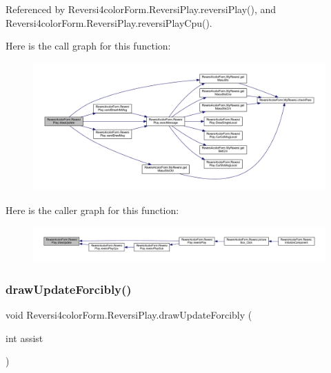 Referenced by Reversi4color\+Form.\+Reversi\+Play.\+reversi\+Play(), and Reversi4color\+Form.\+Reversi\+Play.\+reversi\+Play\+Cpu().

Here is the call graph for this function\+:
\nopagebreak
\begin{figure}[H]
\begin{center}
\leavevmode
\includegraphics[width=350pt]{class_reversi4color_form_1_1_reversi_play_a61428c9797c95359b397564d0bcfa7e7_cgraph}
\end{center}
\end{figure}
Here is the caller graph for this function\+:
\nopagebreak
\begin{figure}[H]
\begin{center}
\leavevmode
\includegraphics[width=350pt]{class_reversi4color_form_1_1_reversi_play_a61428c9797c95359b397564d0bcfa7e7_icgraph}
\end{center}
\end{figure}
\mbox{\label{class_reversi4color_form_1_1_reversi_play_a0ef55faf321fa98d44baad4f25ae6940}} 
\subsubsection{\texorpdfstring{draw\+Update\+Forcibly()}{drawUpdateForcibly()}}
{\footnotesize\ttfamily void Reversi4color\+Form.\+Reversi\+Play.\+draw\+Update\+Forcibly (\begin{DoxyParamCaption}\item[{int}]{assist }\end{DoxyParamCaption})}



